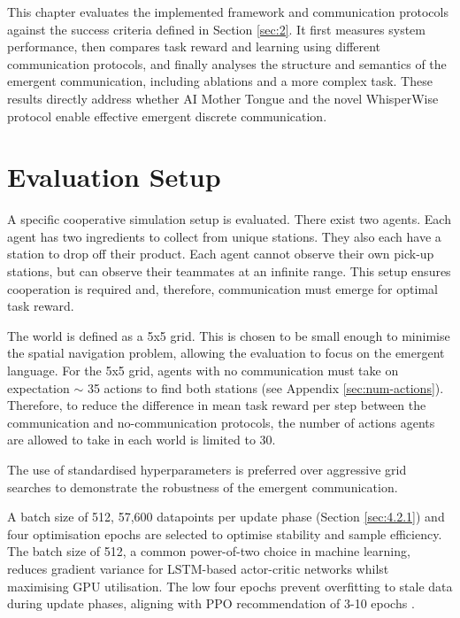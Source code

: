 \label{sec:4}


This chapter evaluates the implemented framework and communication protocols against the success criteria defined in Section \ref{sec:2}.
It first measures system performance, then compares task reward and learning using different communication protocols, and finally analyses the structure and semantics of the emergent communication, including ablations and a more complex task.
These results directly address whether AI Mother Tongue and the novel WhisperWise protocol enable effective emergent discrete communication.

\section{Evaluation Setup}
\label{sec:4.1}

A specific cooperative simulation setup is evaluated.
There exist two agents.
Each agent has two ingredients to collect from unique stations.
They also each have a station to drop off their product.
Each agent cannot observe their own pick-up stations, but can observe their teammates at an infinite range.
This setup ensures cooperation is required and, therefore, communication must emerge for optimal task reward.

The world is defined as a 5x5 grid.
This is chosen to be small enough to minimise the spatial navigation problem, allowing the evaluation to focus on the emergent language.
For the 5x5 grid, agents with no communication must take on expectation $\sim$ 35 actions to find both stations (see Appendix \ref{sec:num-actions}).
Therefore, to reduce the difference in mean task reward per step between the communication and no-communication protocols, the number of actions agents are allowed to take in each world is limited to 30.

The use of standardised hyperparameters is preferred over aggressive grid searches to demonstrate the robustness of the emergent communication.

A batch size of 512, 57,600 datapoints per update phase (Section \ref{sec:4.2.1}) and four optimisation epochs are selected to optimise stability and sample efficiency.
The batch size of 512, a common power-of-two choice in machine learning, reduces gradient variance for LSTM-based actor-critic networks whilst maximising GPU utilisation.
The low four epochs prevent overfitting to stale data during update phases, aligning with PPO recommendation of 3-10 epochs \cite{ppo_bestpractices}.

